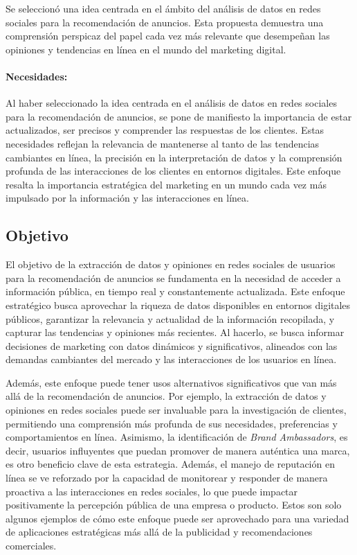 \documentclass[
  letterpaper,
  DIV=11,
  numbers=noendperiod]{scrartcl}
\let\oldparagraph\paragraph
\renewcommand{\paragraph}[1]{\oldparagraph{#1}\mbox{}}
\begin{document}
Se seleccionó una idea centrada en el ámbito del análisis de datos en
redes sociales para la recomendación de anuncios. Esta propuesta
demuestra una comprensión perspicaz del papel cada vez más relevante que
desempeñan las opiniones y tendencias en línea en el mundo del marketing
digital.

\paragraph{Necesidades:}\label{necesidades}

Al haber seleccionado la idea centrada en el análisis de datos en redes
sociales para la recomendación de anuncios, se pone de manifiesto la
importancia de estar actualizados, ser precisos y comprender las
respuestas de los clientes. Estas necesidades reflejan la relevancia de
mantenerse al tanto de las tendencias cambiantes en línea, la precisión
en la interpretación de datos y la comprensión profunda de las
interacciones de los clientes en entornos digitales. Este enfoque
resalta la importancia estratégica del marketing en un mundo cada vez
más impulsado por la información y las interacciones en línea.

\subsection{Objetivo}\label{objetivo}

El objetivo de la extracción de datos y opiniones en redes sociales de
usuarios para la recomendación de anuncios se fundamenta en la necesidad
de acceder a información pública, en tiempo real y constantemente
actualizada. Este enfoque estratégico busca aprovechar la riqueza de
datos disponibles en entornos digitales públicos, garantizar la
relevancia y actualidad de la información recopilada, y capturar las
tendencias y opiniones más recientes. Al hacerlo, se busca informar
decisiones de marketing con datos dinámicos y significativos, alineados
con las demandas cambiantes del mercado y las interacciones de los
usuarios en línea.

Además, este enfoque puede tener usos alternativos significativos que
van más allá de la recomendación de anuncios. Por ejemplo, la extracción
de datos y opiniones en redes sociales puede ser invaluable para la
investigación de clientes, permitiendo una comprensión más profunda de
sus necesidades, preferencias y comportamientos en línea. Asimismo, la
identificación de \emph{Brand Ambassadors}, es decir, usuarios
influyentes que puedan promover de manera auténtica una marca, es otro
beneficio clave de esta estrategia. Además, el manejo de reputación en
línea se ve reforzado por la capacidad de monitorear y responder de
manera proactiva a las interacciones en redes sociales, lo que puede
impactar positivamente la percepción pública de una empresa o producto.
Estos son solo algunos ejemplos de cómo este enfoque puede ser
aprovechado para una variedad de aplicaciones estratégicas más allá de
la publicidad y recomendaciones comerciales.
\end{document}

